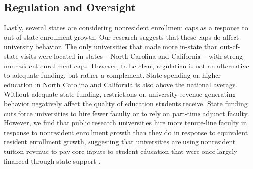 \documentclass{article}
\begin{document}
\subsection*{Regulation and Oversight}

Lastly, several states are considering nonresident enrollment caps as a response to out-of-state enrollment growth. Our research suggests that these caps do affect university behavior. The only universities that made more in-state than out-of-state visits were located in states -- North Carolina and California -- with strong nonresident enrollment caps. However, to be clear, regulation is not an alternative to adequate funding, but rather a complement. State spending on higher education in North Carolina and California is also above the national average.  Without adequate state funding, restrictions on university revenue-generating behavior negatively affect the quality of education students receive. State funding cuts force universities to hire fewer faculty or to rely on part-time adjunct faculty.  However, we find that public research universities hire more tenure-line faculty in response to nonresident enrollment growth than they do in response to equivalent resident enrollment growth, suggesting that universities are using nonresident tuition revenue to pay core inputs to student education that were once largely financed through state support \citep{RN4492}. 

\end{document}
